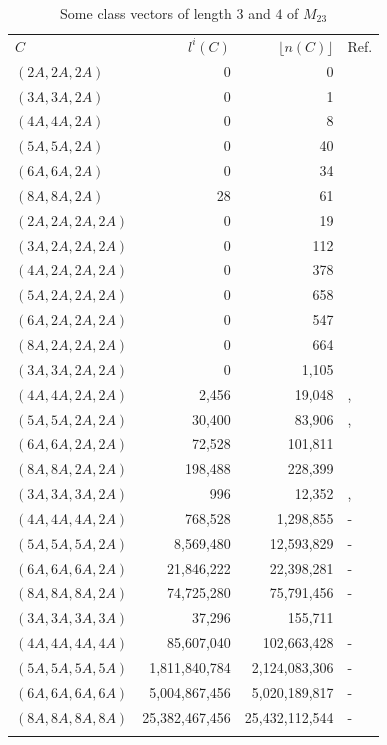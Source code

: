 \documentclass[12pt,a4paper]{article}
\numberwithin{equation}{section}
\numberwithin{table}{section}
\begin{document}
\begin{table}[!htbp]
\centering
\footnotesize
\captionsetup{font=footnotesize}
\caption{Some class vectors of length $3$ and $4$ of $M_{23}$}
\label{tab:Data_4DimClassvectorsM23}
\begin{tabular}{lrrl}
\hline\noalign{\smallskip}
$C$ & $l^i(C)$ & $\lfloor n(C) \rfloor$ & Ref.\\
\noalign{\smallskip}\hline\noalign{\smallskip}
$(2A,2A,2A)$ & 0 & 0 & \cite{RefHae1987}\\
$(3A,3A,2A)$ & 0 & 1 & \cite{RefHae1987}\\
$(4A,4A,2A)$ & 0 & 8 & \cite{RefHae1987}\\
$(5A,5A,2A)$ & 0 & 40 & \cite{RefHae1987}\\
$(6A,6A,2A)$ & 0 & 34 & \cite{RefHae1987}\\
$(8A,8A,2A)$ & 28 & 61 & \cite{RefHae1987}\\
\noalign{\smallskip}\hline\noalign{\smallskip}
$(2A,2A,2A,2A)$ & 0 & 19 & \cite{RefHae1987}\\
$(3A,2A,2A,2A)$ & 0 & 112 & \cite{RefHae1987}\\
$(4A,2A,2A,2A)$ & 0 & 378 & \cite{RefHae1987}\\
$(5A,2A,2A,2A)$ & 0 & 658 & \cite{RefHae1987}\\
$(6A,2A,2A,2A)$ & 0 & 547 & \cite{RefHae1987}\\
$(8A,2A,2A,2A)$ & 0 & 664 & \cite{RefHae1987}\\
\noalign{\smallskip}\hline\noalign{\smallskip}
$(3A,3A,2A,2A)$ & 0 & 1,105 & \cite{RefHae1987}\\
$(4A,4A,2A,2A)$ & 2,456 & 19,048 & \cite{RefHae1987}, \cite{RefHae1991}\\
$(5A,5A,2A,2A)$ & 30,400 & 83,906 & \cite{RefHae1987}, \cite{RefHae1991}\\
$(6A,6A,2A,2A)$ & 72,528 & 101,811 & \cite{RefHae1991}\\
$(8A,8A,2A,2A)$ & 198,488 & 228,399 & \cite{RefHae1991}\\
\noalign{\smallskip}\hline\noalign{\smallskip}
$(3A,3A,3A,2A)$ & 996 & 12,352 & \cite{RefHae1987}, \cite{RefHae1991}\\
$(4A,4A,4A,2A)$ & 768,528 & 1,298,855 & -\\
$(5A,5A,5A,2A)$ & 8,569,480 & 12,593,829 & -\\
$(6A,6A,6A,2A)$ & 21,846,222 & 22,398,281 & -\\
$(8A,8A,8A,2A)$ & 74,725,280 & 75,791,456 & -\\
\noalign{\smallskip}\hline\noalign{\smallskip}
$(3A,3A,3A,3A)$ & 37,296 & 155,711 & \cite{RefHae1991}\\
$(4A,4A,4A,4A)$ & 85,607,040 & 102,663,428 & -\\
$(5A,5A,5A,5A)$ & 1,811,840,784 & 2,124,083,306 & -\\
$(6A,6A,6A,6A)$ & 5,004,867,456 & 5,020,189,817 & -\\
$(8A,8A,8A,8A)$ & 25,382,467,456 & 25,432,112,544 & -\\
\noalign{\smallskip}\hline
\end{tabular}
\end{table}
\end{document}

